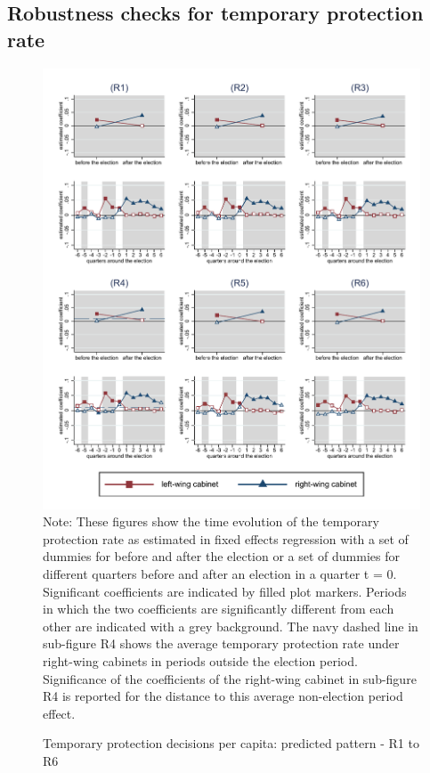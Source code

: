 \documentclass[11pt,a4paper]{scrartcl}
\begin{document}
\clearpage
\FloatBarrier
\subsection{Robustness checks for temporary protection rate}



\clearpage
\FloatBarrier
\begin{figure}[!ht]
	\caption{Temporary protection decisions per capita: predicted pattern - R1 to R6}
	\includegraphics[width=1\textwidth]{../results/decisions/temporary_protection_rate_graphs_R1-R6.pdf}
	\scriptsize{Note: These figures show the time evolution of the temporary protection rate as estimated in fixed effects regression with a set of dummies for before and after the election or a set of dummies for different quarters before and after an election in a quarter t = 0. Significant coefficients are indicated by filled plot markers. Periods in which the two coefficients are significantly different from each other are indicated with a grey background. The navy dashed line in sub-figure R4 shows the average temporary protection rate under right-wing cabinets in periods outside the election period. Significance of the coefficients of the right-wing cabinet in sub-figure R4 is reported for the distance to this average non-election period effect.}
\end{figure}
\end{document}
